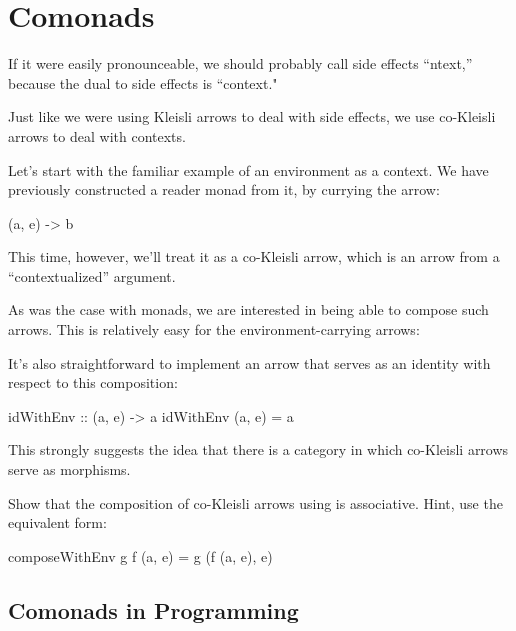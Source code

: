 \documentclass[DaoFP]{subfiles}
\begin{document}
\setcounter{chapter}{16}

\chapter{Comonads}

If it were easily pronounceable, we should probably call side effects ``ntext,'' because the dual to side effects is ``context."

Just like we were using Kleisli arrows to deal with side effects, we use co-Kleisli arrows to deal with contexts. 

Let's start with the familiar example of an environment as a context. We have previously constructed a reader monad from it, by currying the arrow:
\begin{haskell}
(a, e) -> b
\end{haskell}
This time, however, we'll treat it as a co-Kleisli arrow, which is an arrow from a ``contextualized'' argument.

As was the case with monads, we are interested in being able to compose such arrows. This is relatively easy for the environment-carrying arrows:

It's also straightforward to implement an arrow that serves as an identity with respect to this composition:

\begin{haskell}
idWithEnv :: (a, e) -> a
idWithEnv (a, e) = a
\end{haskell}

This strongly suggests the idea that there is a category in which co-Kleisli arrows serve as morphisms. 

\begin{exercise}
Show that the composition of co-Kleisli arrows using  is associative. Hint, use the equivalent form:
\begin{haskell}
composeWithEnv g f (a, e) = g (f (a, e), e)
\end{haskell}

\end{exercise}

\section{Comonads in Programming}
\end{document}
